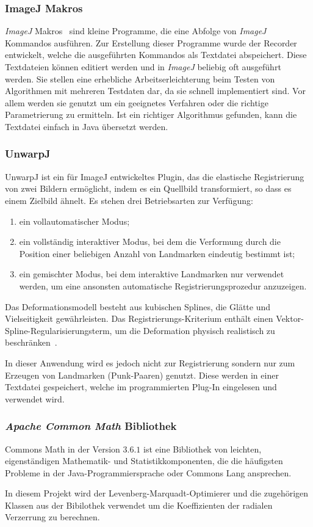 \subsubsection{ImageJ Makros}	
\textit{ImageJ} Makros~\cite{JMacros} sind kleine Programme, die eine Abfolge von \textit{ImageJ} Kommandos ausführen. Zur Erstellung dieser Programme wurde der Recorder entwickelt, welche die ausgeführten Kommandos als Textdatei abspeichert. Diese Textdateien können editiert werden und in \textit{ImageJ} beliebig oft ausgeführt werden. Sie stellen eine erhebliche Arbeitserleichterung beim Testen von Algorithmen mit mehreren Testdaten dar, da sie schnell implementiert sind. Vor allem werden sie genutzt um ein geeignetes Verfahren oder die richtige Parametrierung zu ermitteln. Ist ein richtiger Algorithmus gefunden, kann die Textdatei einfach in Java übersetzt werden.


\subsubsection{UnwarpJ}

UnwarpJ ist ein für ImageJ entwickeltes Plugin, das die elastische Registrierung von zwei Bildern ermöglicht, indem es ein Quellbild transformiert, so dass es einem Zielbild ähnelt. 
Es stehen drei Betriebsarten zur Verfügung: 

\begin{enumerate}
\item ein vollautomatischer Modus; 
\item ein vollständig interaktiver Modus, bei dem die Verformung durch die Position einer beliebigen Anzahl von Landmarken eindeutig bestimmt ist; 
\item ein gemischter Modus, bei dem interaktive Landmarken nur verwendet werden, um eine ansonsten automatische Registrierungsprozedur anzuzeigen.
\end{enumerate}

Das Deformationsmodell besteht aus kubischen Splines, die Glätte und Vielseitigkeit gewährleisten. Das Registrierungs-Kriterium enthält einen Vektor-Spline-Regularisierungsterm, um die Deformation physisch realistisch zu beschränken~\cite{unwrapj}.

In dieser Anwendung wird es jedoch nicht zur Registrierung sondern nur zum Erzeugen von Landmarken (Punk-Paaren) genutzt. Diese werden in einer Textdatei gespeichert, welche im programmierten Plug-In eingelesen und verwendet wird.

\subsubsection{\textit{Apache Common Math} Bibliothek}

Commons Math in der Version $3.6.1$ ist eine Bibliothek von leichten, eigenständigen Mathematik- und Statistikkomponenten, die die häufigsten Probleme in der Java-Programmiersprache oder Commons Lang ansprechen.
\cite{appache}

In diesem Projekt wird der Levenberg-Marquadt-Optimierer und die zugehörigen Klassen aus der Bibilothek verwendet um die Koeffizienten der radialen Verzerrung zu berechnen.
